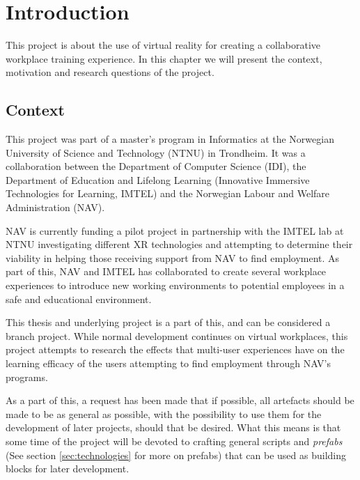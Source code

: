 
\chapter{Introduction}

This project is about the use of virtual reality for creating a collaborative workplace training experience. In this chapter we will present the context, motivation and research questions of the project. 

\section{Context}
\label{section:context}
This project was part of a master's program in Informatics at the Norwegian University of Science and Technology (NTNU) in Trondheim. It was a collaboration between the Department of Computer Science (IDI), the Department of Education and Lifelong Learning (Innovative Immersive Technologies for Learning, IMTEL) and the Norwegian Labour and Welfare Administration (NAV). 

NAV is currently funding a pilot project in partnership with the IMTEL lab at NTNU investigating different XR technologies and attempting to determine their viability in helping those receiving support from NAV to find employment. As part of this, NAV and IMTEL has collaborated to create several workplace experiences to introduce new working environments to potential employees in a safe and educational environment.

This thesis and underlying project is a part of this, and can be considered a branch project. While normal development continues on virtual workplaces, this project attempts to research the effects that multi-user experiences have on the learning efficacy of the users attempting to find employment through NAV's programs. 

As a part of this, a request has been made that if possible, all artefacts should be made to be as general as possible, with the possibility to use them for the development of later projects, should that be desired. What this means is that some time of the project will be devoted to crafting general scripts and \textit{prefabs} (See section \ref{sec:technologies} for more on prefabs) that can be used as building blocks for later development.


